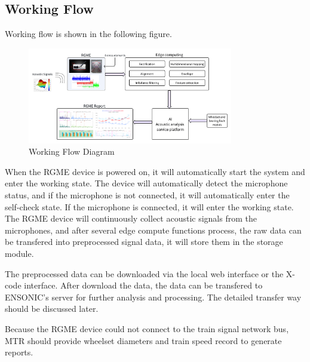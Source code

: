 \documentclass{article}
\begin{document}
\subsection{Working Flow}
Working flow is shown in the following figure.
\begin{figure}[htbp]
    \centering
    \includegraphics[width=0.8\textwidth]{./工作流程图.png}
    \caption{Working Flow Diagram}
    \label{fig:working-flow}
\end{figure}
When the RGME device is powered on, it will automatically start the system and enter the working state. The device will automatically detect the microphone status, and if the microphone is not connected, it will automatically enter the self-check state. If the microphone is connected, it will enter the working state. The RGME device will continuously collect acoustic signals from the microphones, and after several edge compute functions process, the raw data can be transfered into preprocessed signal data, it will store them in the storage module.

The preprocessed data can be downloaded via the local web interface or the X-code interface. After download the data, the data can be transfered to ENSONIC's server for further analysis and processing. The detailed transfer way should be discussed later.

Because the RGME device could not connect to the train signal network bus, MTR should provide wheelset diameters and train speed record to generate reports.
\end{document}

